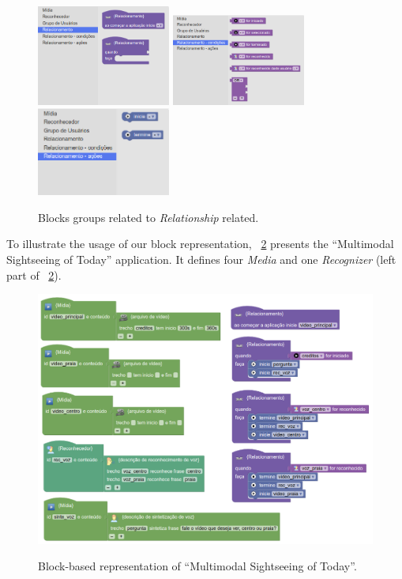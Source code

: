 \documentclass[
  doutorado,
  american
]{ThesisPUC}
\newcommand{\fig}[1]{\figurename~\ref{#1}}
\newcommand{\captionvspace}{\vspace{-1.3em}}
\begin{document}
\begin{figure}[!ht]
\begin{center}
	\includegraphics[width=4.4cm, keepaspectratio]{img/img14a.png}
	\includegraphics[width=4.4cm, keepaspectratio]{img/img14b.png}
	\includegraphics[width=4.4cm, keepaspectratio]{img/img14c.png}
	\caption{Blocks groups related to \textit{Relationship} related.}
	\label{fig:blocks1}
	\captionvspace
\end{center}
\end{figure}

To illustrate the usage of our block representation, \fig{fig:blocks2} presents
the “Multimodal Sightseeing of Today” application. It defines four
\textit{Media} and one 
\textit{Recognizer} (left part of \fig{fig:blocks2}). 

\begin{figure}[!ht]
  \begin{center}
    \includegraphics[width=14cm, keepaspectratio]{img/img15.png}
    \captionvspace
    \caption{Block-based representation of “Multimodal Sightseeing of Today”.}
    \captionvspace
    \label{fig:blocks2}
  \end{center}
\end{figure}
\end{document}
